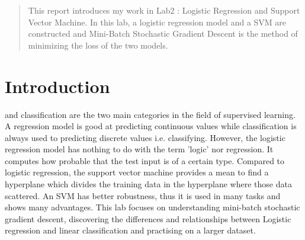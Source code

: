 \documentclass[journal, a4paper]{IEEEtran}
\begin{document}
\begin{abstract}
This report introduces my work in Lab2 : Logistic Regression and Support Vector Machine. In this lab, a logistic regression model and a SVM are constructed and Mini-Batch Stochastic Gradient Descent is the method of minimizing the loss of the two models.
\end{abstract}

\section{Introduction}
 and classification are the two main categories in the field of supervised learning. A regression model is good at predicting continuous values while classification is always used to predicting discrete values i.e. classifying. However, the logistic regression model has nothing to do with the term 'logic' nor regression. It computes how probable that the test input is of a certain type. Compared to logistic regression, the support vector machine provides a mean to find a hyperplane which divides the training data in the hyperplane where those data scattered. An SVM has better robustness, thus it is used in many tasks and shows many advantages. This lab focuses on understanding mini-batch stochastic gradient descent, discovering the differences and relationships between Logistic regression and linear classification and practising on a larger dataset.

\end{document}
